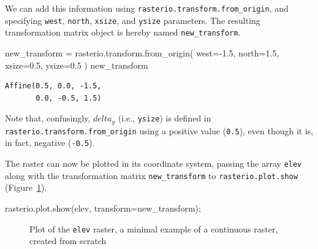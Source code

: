 \documentclass[
  letterpaper,
]{krantz}
\newenvironment{Shaded}{\begin{snugshade}}{\end{snugshade}}
\newcommand{\FloatTok}[1]{\textcolor[rgb]{0.68,0.00,0.00}{#1}}
\newcommand{\NormalTok}[1]{\textcolor[rgb]{0.00,0.23,0.31}{#1}}
\newcommand{\OperatorTok}[1]{\textcolor[rgb]{0.37,0.37,0.37}{#1}}
\begin{document}
We can add this information using
\texttt{rasterio.transform.from\_origin}, and specifying \texttt{west},
\texttt{north}, \texttt{xsize}, and \texttt{ysize} parameters. The
resulting transformation matrix object is hereby named
\texttt{new\_transform}.

\begin{Shaded}
\begin{Highlighting}[]
\NormalTok{new\_transform }\OperatorTok{=}\NormalTok{ rasterio.transform.from\_origin(}
\NormalTok{    west}\OperatorTok{={-}}\FloatTok{1.5}\NormalTok{, }
\NormalTok{    north}\OperatorTok{=}\FloatTok{1.5}\NormalTok{, }
\NormalTok{    xsize}\OperatorTok{=}\FloatTok{0.5}\NormalTok{, }
\NormalTok{    ysize}\OperatorTok{=}\FloatTok{0.5}
\NormalTok{)}
\NormalTok{new\_transform}
\end{Highlighting}
\end{Shaded}

\begin{verbatim}
Affine(0.5, 0.0, -1.5,
       0.0, -0.5, 1.5)
\end{verbatim}

Note that, confusingly, \(delta_{y}\) (i.e., \texttt{ysize}) is defined
in \texttt{rasterio.transform.from\_origin} using a positive value
(\texttt{0.5}), even though it is, in fact, negative (\texttt{-0.5}).

The raster can now be plotted in its coordinate system, passing the
array \texttt{elev} along with the transformation matrix
\texttt{new\_transform} to \texttt{rasterio.plot.show}
(Figure~\ref{fig-rasterio-plot-elev}).

\begin{Shaded}
\begin{Highlighting}[]
\NormalTok{rasterio.plot.show(elev, transform}\OperatorTok{=}\NormalTok{new\_transform)}\OperatorTok{;}
\end{Highlighting}
\end{Shaded}

\begin{figure}[H]


\caption{\label{fig-rasterio-plot-elev}Plot of the \texttt{elev} raster,
a minimal example of a continuous raster, created from scratch}

\end{figure}%
\end{document}
